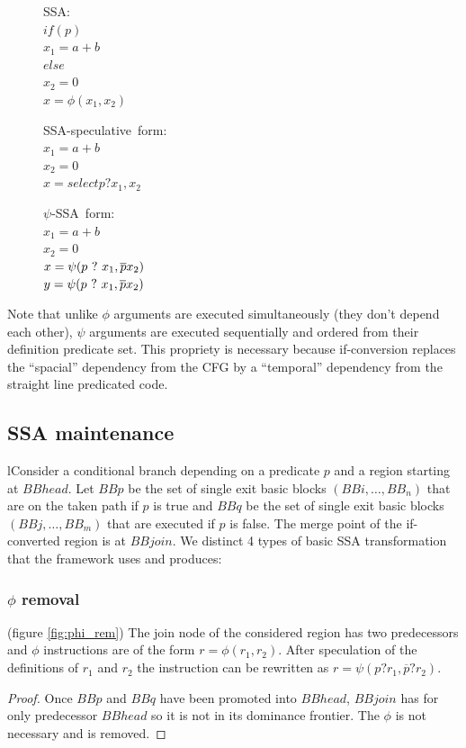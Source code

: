 \begin{figure}
\begin{minipage}[t]{4cm}
\mbox{SSA:} \\
$ if (p) $ \\
$   x_1 = a+b $ \\
$ else $ \\
$   x_2 = 0 $ \\
$ x = \phi (x_1, x_2) $ \\
\end{minipage}
\begin{minipage}[t]{4cm}
\mbox{SSA-speculative form:} \\
$x_1 = a + b $ \\
$x_2 = 0 $ \\
$x = select p ? x_1, x_2$ \\
\end{minipage}
\begin{minipage}[t]{4cm}
\mbox{$\psi$-SSA form:} \\
$x_1 = a + b $ \\
$x_2 = 0 $\\
$x = \psi (p ~?~ x_1, \overline{p} x_2) $ \\
$y = \psi (p ~?~ x_1, \overline{p} x_2) $ \\
\end{minipage}
\end{figure}

Note that unlike $\phi$ arguments are executed simultaneously (they don't depend each other), $\psi$ arguments are executed sequentially and ordered from their definition predicate set. This propriety is necessary because if-conversion replaces the ``spacial'' dependency from the CFG by a ``temporal'' dependency from the straight line predicated code.

\subsection{SSA maintenance}

lConsider a conditional branch depending on a predicate $p$ and a region starting at $BBhead$. Let $BBp$ be the set of single exit basic blocks $(BBi,\dots,BB_n)$ that are on the taken path if $p$ is true and $BBq$ be the set of single exit basic blocks $(BBj,\dots,BB_m)$ that are executed if $p$ is false. The merge point of the if-converted region is at $BBjoin$. We distinct 4 types of basic SSA transformation that the framework uses and produces:
\subsubsection{$\phi$ removal} (figure \ref{fig:phi_rem})
The join node of the considered region has two predecessors and $\phi$ instructions are of the form $r=\phi(r_1,r_2)$. After speculation of the definitions of $r_1$ and $r_2$ the instruction can be rewritten as $r=\psi(p?r_1,\overline{p}?r_2)$.
\begin{proof} Once $BBp$ and $BBq$ have been promoted into $BBhead$, $BBjoin$ has for only predecessor $BBhead$ so it is not in its dominance frontier. The $\phi$ is not necessary and is removed.
\end{proof}
